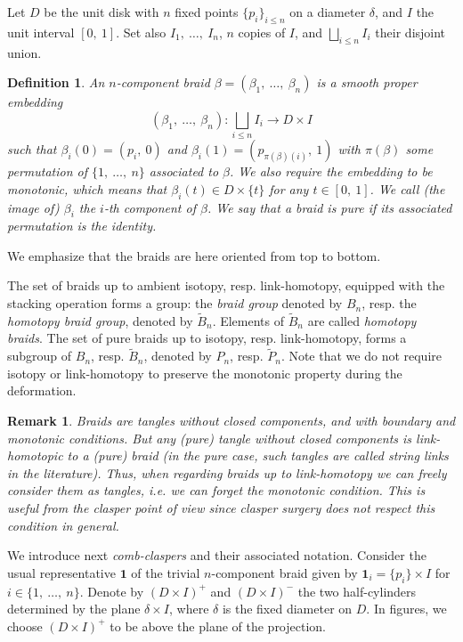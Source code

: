 \documentclass[11pt, a4paper, twoside,reqno]{amsart}
\newtheorem{defn}[thm]{Definition}
\newtheorem{rmq}[thm]{Remark}
\begin{document}
Let $D$ be the unit disk with $n$ fixed points $\{p_i\}_{i\leq n}$ on a diameter $\delta$, and $I$ the unit interval $[0,\ 1]$. Set also $I_1,\ \ldots,\ I_n$, $n$ copies of $I$, and $\underset{i\leq n}\bigsqcup I_i$ their disjoint union. 
\begin{defn}\label{braiddef}
An \emph{$n$-component braid} $\beta=(\beta_1,\ \ldots,\ \beta_n)$ is a smooth proper embedding  \[(\beta_1,\ \ldots,\ \beta_n) :\underset{i\leq n}{\bigsqcup}I_i \to D\times I\] 
such that $\beta_i(0)=(p_i,\ 0)$ and $\beta_i(1)=(p_{\pi(\beta)(i)},\ 1)$ with $\pi(\beta)$ some permutation of $\{1,\ \ldots,\ n\}$ associated to $\beta$. We also require the embedding to be monotonic, which means that $\beta_i(t)\in D\times \{t\}$ for any $t\in[0,\ 1]$. We call (the image of) $\beta_i$ the \emph{$i$-th component} of $\beta$. We say that a braid is \emph{pure} if its associated permutation is the identity.
\end{defn}
We emphasize that the braids are here oriented from top to bottom.

The set of braids up to ambient isotopy, resp. link-homotopy, equipped with the stacking operation forms a group: the \emph{braid group} denoted by $B_n$, resp. the \emph{homotopy braid group}, denoted by $\tilde B_n$. Elements of $\tilde B_n$ are called \emph{homotopy braids}. The set of pure braids up to isotopy, resp. link-homotopy, forms a subgroup of $B_n$, resp. $\tilde B_n$, denoted by $P_n$, resp. $\tilde P_n$. Note that we do not require isotopy or link-homotopy to preserve the monotonic property during the deformation.

\begin{rmq}\label{rmqstringlink}
Braids are tangles without closed components, and with boundary and monotonic conditions. 
But any (pure) tangle without closed components is link-homotopic to a (pure) braid (in the pure case, such tangles are called string links in the literature). Thus, when regarding braids up to link-homotopy we can freely consider them as tangles, i.e. we can forget the monotonic condition. 
This is useful from the clasper point of view since clasper surgery does not respect this condition in general. 
\end{rmq}
 
We introduce next \emph{comb-claspers} and their associated notation. Consider the usual representative $\mathbf 1$ of the trivial $n$-component braid given by $\mathbf1_i=\{p_i\}\times I$ for $i\in\{1,\ \ldots,\ n\}$. Denote by $(D\times I)^+$ and $(D\times I)^-$ the two half-cylinders determined by the plane $\delta\times I$, where $\delta$ is the fixed diameter on $D$. In figures, we choose $(D\times I)^+$ to be above the plane of the projection.
\end{document}
